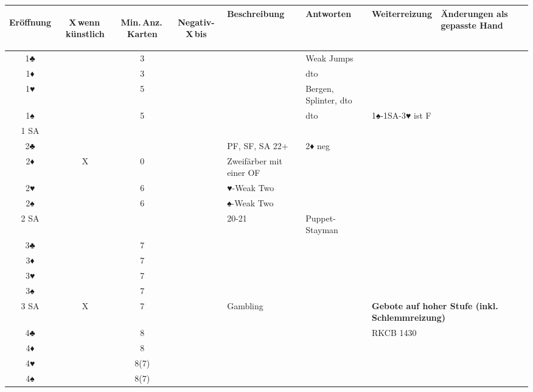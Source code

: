 \documentclass{article}
\begin{document}
\begin{tabularx}{\columnwidth}{|c|c|c|c|l|l|X|l|}
\hline
 \begin{sideways}\bf Eröffnung\end{sideways} &
 \begin{sideways}X\,wenn\,künstlich\end{sideways} &
 \begin{sideways}Min.\,Anz.\,Karten\end{sideways} &
 \begin{sideways}Negativ-X\,bis\end{sideways} &
 \bf Beschreibung &
 \bf Antworten &
 \bf Weiterreizung &
 \bf Änderungen als gepasste Hand \\
\hline 1♣   & &3   & & & Weak Jumps & & \\
\hline 1♦   & &3   & & & dto & & \\
\hline 1♥   & &5   & & & Bergen, Splinter, dto & & \\
\hline 1♠   & &5   & & & dto & 1♠-1SA-3♥ ist F & \\
\hline 1 SA & &    & & & & & \\
\hline 2♣   & &    & & PF, SF, SA 22+ & 2♦ neg & & \\
\hline 2♦   &X&0   & & Zweifärber mit einer OF & & & \\
\hline 2♥   & &6   & & ♥-Weak Two & & & \\
\hline 2♠   & &6   & & ♠-Weak Two & & & \\
\hline 2 SA & &    & & 20-21 & Puppet-Stayman & & \\
\hline 3♣   & &7   & & & & & \\
\hline 3♦   & &7   & & & & & \\
\hline 3♥   & &7   & & & & & \\
\hline 3♠   & &7   & & & & & \\
\hline 3 SA &X&7   & & Gambling & & \multicolumn{2}{l|}{\bf Gebote auf hoher Stufe (inkl. Schlemmreizung)} \\
\hline 4♣   & &8   & & & & \multicolumn{2}{l|}{RKCB 1430} \\
\hline 4♦   & &8   & & & & \multicolumn{2}{l|}{} \\
\hline 4♥   & &8(7)& & & & \multicolumn{2}{l|}{} \\
\hline 4♠   & &8(7)& & & & \multicolumn{2}{l|}{} \\
\hline \end{tabularx}
\end{document}
